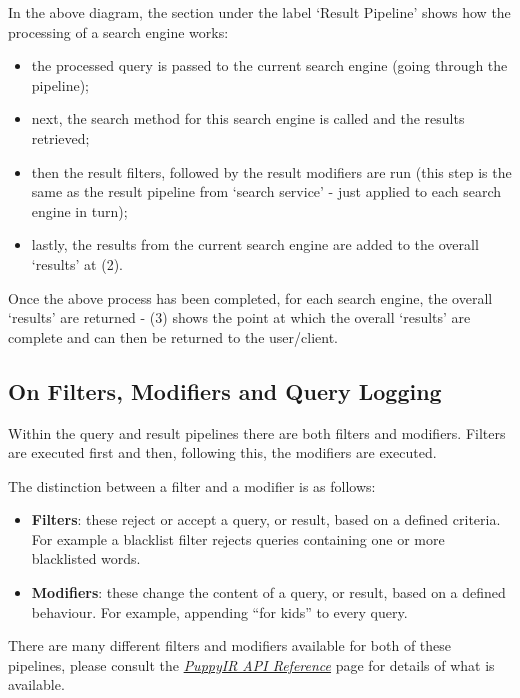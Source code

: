 \documentclass[letterpaper,10pt,english]{sphinxmanual}
\begin{document}
In the above diagram, the section under the label `Result Pipeline' shows how the processing of a search engine works:
\begin{itemize}
\item {} 
the processed query is passed to the current search engine (going through the pipeline);

\item {} 
next, the search method for this search engine is called and the results retrieved;

\item {} 
then the result filters, followed by the result modifiers are run (this step is the same as the result pipeline from `search service' - just applied to each search engine in turn);

\item {} 
lastly, the results from the current search engine are added to the overall `results' at (2).

\end{itemize}

Once the above process has been completed, for each search engine, the overall `results' are returned - (3) shows the point at which the overall `results' are complete and can then be returned to the user/client.


\subsection{On Filters, Modifiers and Query Logging}
\label{pipeline:on-filters-modifiers-and-query-logging}
Within the query and result pipelines there are both filters and modifiers. Filters are executed first and then, following this, the modifiers are executed.

The distinction between a filter and a modifier is as follows:
\begin{itemize}
\item {} 
\textbf{Filters}: these reject or accept a query, or result, based on a defined criteria. For example a blacklist filter rejects queries containing one or more blacklisted words.

\item {} 
\textbf{Modifiers}: these change the content of a query, or result, based on a defined behaviour. For example, appending “for kids” to every query.

\end{itemize}

There are many different filters and modifiers available for both of these pipelines, please consult the {\hyperref[api3.0:api]{\emph{PuppyIR API Reference}}} page for details of what is available.
\end{document}
